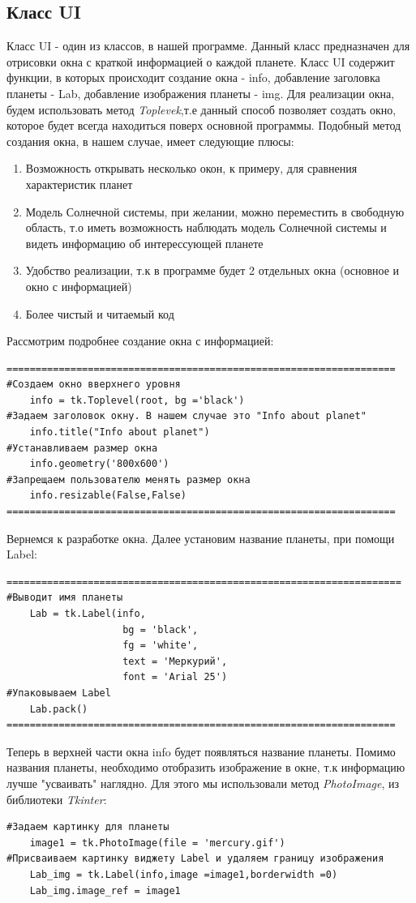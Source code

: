 \documentclass[11pt,a4paper]{report}
\begin{document}
\subsection{Класс UI}
Класс UI - один из классов, в нашей программе. Данный класс предназначен для отрисовки окна с краткой информацией о каждой планете.
Класс UI содержит функции, в которых происходит создание окна  - info, добавление заголовка планеты - Lab, добавление изображения планеты - img. 
Для реализации окна, будем использовать метод \textit{Toplevek},т.е данный способ позволяет создать окно, которое будет всегда находиться поверх основной программы. 
Подобный метод создания окна, в нашем случае, имеет следующие плюсы:
\begin{enumerate}
    \item Возможность открывать несколько окон, к примеру, для сравнения характеристик планет
    \item Модель Солнечной системы, при желании, можно переместить в свободную область, т.о иметь возможность наблюдать модель Солнечной системы и видеть информацию об интерессующей планете
    \item Удобство реализации, т.к в программе будет 2 отдельных окна (основное и окно с информацией)
    \item Более чистый и читаемый код
\end{enumerate}
Рассмотрим подробнее создание окна с информацией:
\begin{verbatim}
===================================================================
#Создаем окно вверхнего уровня
    info = tk.Toplevel(root, bg ='black')
#Задаем заголовок окну. В нашем случае это "Info about planet"
    info.title("Info about planet")
#Устанавливаем размер окна
    info.geometry('800x600')
#Запрещаем пользователю менять размер окна
    info.resizable(False,False)
===================================================================
\end{verbatim}
Вернемся к разработке окна.
Далее установим название планеты, при помощи Label:
\begin{verbatim}
====================================================================
#Выводит имя планеты
    Lab = tk.Label(info,
                    bg = 'black',
                    fg = 'white',
                    text = 'Меркурий', 
                    font = 'Arial 25')
#Упаковываем Label
    Lab.pack()
===================================================================
\end{verbatim}
Теперь в верхней части окна info будет появляться  название планеты.
Помимо названия планеты, необходимо отобразить изображение в окне, т.к информацию лучше "усваивать" наглядно.
Для этого мы использовали метод \textit{PhotoImage}, из библиотеки \textit{Tkinter}:
\begin{verbatim}
#Задаем картинку для планеты
    image1 = tk.PhotoImage(file = 'mercury.gif')
#Присваиваем картинку виджету Label и удаляем границу изображения
    Lab_img = tk.Label(info,image =image1,borderwidth =0)
    Lab_img.image_ref = image1
\end{verbatim}
\end{document}
